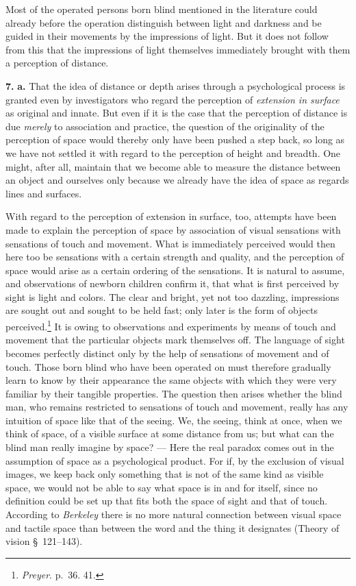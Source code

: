 \documentclass[12pt,a4paper]{book}
\newcommand{\opage}[1]{\marginnote{\footnotesize\textit{[#1]}}}
\begin{document}
Most of the operated persons born blind mentioned in the literature
could already before the operation distinguish between light and
darkness and be guided in their movements by the impressions of light.
But it does not follow from this that the impressions of light
themselves immediately brought with them a perception of distance.

\textbf{7.} \textbf{a.} That the idea of distance or depth arises
through a psychological process is granted even by investigators who
regard the perception of \emph{extension in surface} as original and
innate. But even if it is the case that the perception of distance is
due \emph{merely} to association and practice, the question of the
originality of the perception of space would thereby only have been
pushed a step back, so long as we have not settled it with regard to the
perception of height and breadth. One might, after all, maintain that we
become able to measure the distance between an object and ourselves only
because we already have the idea of space as regards lines and surfaces.

With regard to the perception of extension in surface, too, attempts
have been made to explain the perception of space by association of
visual sensations with sensations of touch and movement. What is
immediately perceived would then here too be sensations with a certain
strength and quality, and the perception of space would arise as a
certain ordering of the sensations. It is natural to assume, and
observations of newborn children confirm it, that what is first
perceived by sight is light and colors. The clear and
\opage{241}bright, yet not too dazzling, impressions are sought out and
sought to be held fast; only later is the form of objects
perceived.\footnote{\emph{Preyer}. p.~36. 41.} It is owing to
observations and experiments by means of touch and movement that the
particular objects mark themselves off. The language of sight becomes
perfectly distinct only by the help of sensations of movement and of
touch. Those born blind who have been operated on must therefore
gradually learn to know by their appearance the same objects with which
they were very familiar by their tangible properties. The question then
arises whether the blind man, who remains restricted to sensations of
touch and movement, really has any intuition of space like that of the
seeing. We, the seeing, think at once, when we think of space, of a
visible surface at some distance from us; but what can the blind man
really imagine by space? --- Here the real paradox comes out in the
assumption of space as a psychological product. For if, by the exclusion
of visual images, we keep back only something that is not of the same
kind as visible space, we would not be able to say what space is in and
for itself, since no definition could be set up that fits both the space
of sight and that of touch. According to \emph{Berkeley} there is no
more natural connection between visual space and tactile space than
between the word and the thing it designates (Theory of vision
§~121--143).
\end{document}
